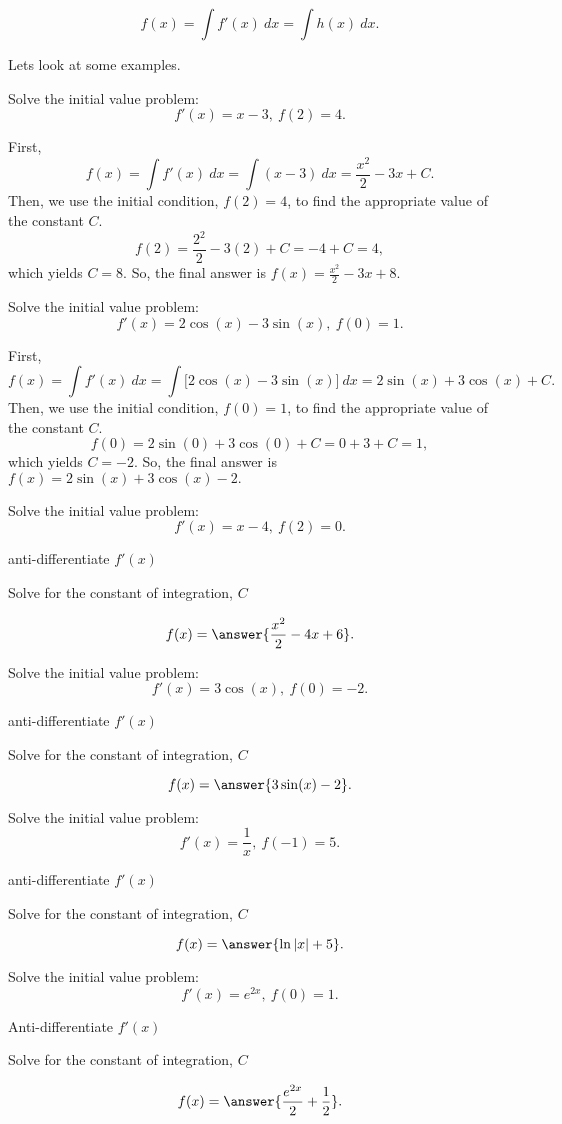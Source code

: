 \documentclass{ximera}
\begin{document}
\[f(x) = \int f'(x) \ dx = \int h(x) \ dx.\]

Lets look at some examples.

\begin{example}
Solve the initial value problem:
\[f'(x) = x - 3, \ f(2) = 4.\]

First, 
\[f(x) = \int f'(x) \ dx = \int (x-3)  \ dx = \frac{x^2}{2} - 3x + C.\]
Then, we use the initial condition, $f(2) = 4$, to find the 
appropriate value of the constant $C$.
\[f(2) = \frac{2^2}{2} - 3(2) + C = -4 + C = 4,\]
which yields $C = 8$.
So, the final answer is  $f(x) = \frac{x^2}{2} -3x + 8.$
\end{example}

\begin{example}
Solve the initial value problem:
\[f'(x) = 2\cos(x) -3\sin(x), \ f(0) = 1.\]

First, 
\[f(x) = \int f'(x) \ dx = \int \big[2\cos(x) -3\sin(x)\big]  \ dx =
 2\sin(x) + 3\cos(x) + C.\]
Then, we use the initial condition, $f(0) = 1$, to find the 
appropriate value of the constant $C$.
\[f(0) = 2\sin(0) + 3\cos(0) + C = 0 + 3 + C = 1,\]
which yields $C = -2$.
So, the final answer is  $f(x) = 2\sin(x) + 3\cos(x)-2.$
\end{example}

\begin{problem}
Solve the initial value problem:
\[f'(x) = x-4, \ f(2) = 0.\]
\begin{hint}
anti-differentiate $f'(x)$
\end{hint}
\begin{hint}
Solve for the constant of integration, $C$
\end{hint}
\[f(x) = \answer{\frac{x^2}{2} - 4x + 6}.\]
\end{problem}

\begin{problem}
Solve the initial value problem:
\[f'(x) = 3\cos(x), \ f(0) = -2.\]
\begin{hint}
anti-differentiate $f'(x)$
\end{hint}
\begin{hint}
Solve for the constant of integration, $C$
\end{hint}
\[f(x) = \answer{3\sin(x) - 2}.\]
\end{problem}

\begin{problem}
Solve the initial value problem:
\[f'(x) = \frac{1}{x}, \ f(-1) = 5.\]
\begin{hint}
anti-differentiate $f'(x)$
\end{hint}
\begin{hint}
Solve for the constant of integration, $C$
\end{hint}
\[f(x) = \answer{\ln|x| + 5}.\]
\end{problem}

\begin{problem}
Solve the initial value problem:
\[f'(x) = e^{2x}, \ f(0) = 1.\]
\begin{hint}
Anti-differentiate $f'(x)$
\end{hint}
\begin{hint}
Solve for the constant of integration, $C$
\end{hint}
\[f(x) = \answer{\frac{e^{2x}}{2} + \frac12}.\]
\end{problem}
\end{document}
